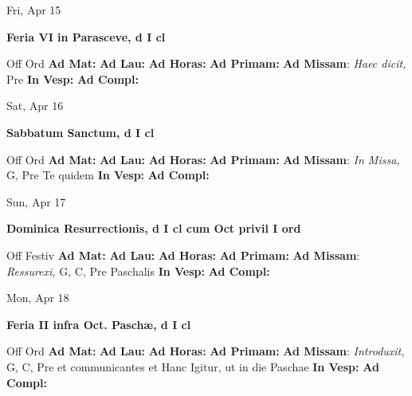 \documentclass[10pt]{article}
\begin{document}
\begin{minipage}{3.5in}
\vspace{2em}\begin{center}
Fri, Apr 15
\end{center}\textbf{ \large Feria VI in Parasceve, \textnormal{\normalsize d I cl}}
\begin{justify}
Off Ord
\textbf{Ad Mat: }
\textbf{Ad Lau: }
\textbf{Ad Horas: }
\textbf{Ad Primam: }
\textbf{Ad Missam}: \textit{Haec dicit,} Pre 
\textbf{In Vesp: }
\textbf{Ad Compl: }\end{justify}
\end{minipage}



\begin{minipage}{3.5in}
\vspace{2em}\begin{center}
Sat, Apr 16
\end{center}\textbf{ \large Sabbatum Sanctum, \textnormal{\normalsize d I cl}}
\begin{justify}
Off Ord
\textbf{Ad Mat: }
\textbf{Ad Lau: }
\textbf{Ad Horas: }
\textbf{Ad Primam: }
\textbf{Ad Missam}: \textit{In Missa,} G, Pre Te quidem
\textbf{In Vesp: }
\textbf{Ad Compl: }\end{justify}
\end{minipage}



\begin{minipage}{3.5in}
\vspace{2em}\begin{center}
Sun, Apr 17
\end{center}\textbf{ \large Dominica Resurrectionis, \textnormal{\normalsize d I cl cum Oct privil I ord}}
\begin{justify}
Off Festiv
\textbf{Ad Mat: }
\textbf{Ad Lau: }
\textbf{Ad Horas: }
\textbf{Ad Primam: }
\textbf{Ad Missam}: \textit{Ressurexi,} G, C, Pre Paschalis
\textbf{In Vesp: }
\textbf{Ad Compl: }\end{justify}
\end{minipage}



\begin{minipage}{3.5in}
\vspace{2em}\begin{center}
Mon, Apr 18
\end{center}\textbf{ \large Feria II infra Oct. Paschæ, \textnormal{\normalsize d I cl}}
\begin{justify}
Off Ord
\textbf{Ad Mat: }
\textbf{Ad Lau: }
\textbf{Ad Horas: }
\textbf{Ad Primam: }
\textbf{Ad Missam}: \textit{Introduxit,} G, C, Pre et communicantes et Hanc Igitur, ut in die Paschae
\textbf{In Vesp: }
\textbf{Ad Compl: }\end{justify}
\end{minipage}
\end{document}
